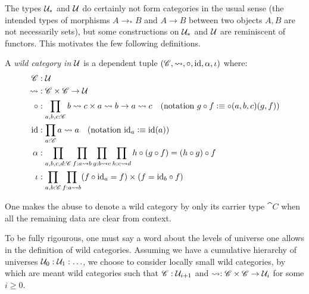 \documentclass[english,a4]{article}
\renewcommand{\ap}[1]{\left[{#1}\right]}
\newcommand{\ptdto}{\to_\ast}%
\newcommand{\UUptd}{\UU_{\ast}}
\begin{document}

\label{sec:wild-functors}
\def\hom(#1,#2){#1 \rightsquigarrow #2}
%
The types $\UUptd$ and $\mathcal{U}$ do certainly not form categories in the usual
sense (the intended types of morphisms $A \ptdto B$ and $A\to B$ between two
objects $A,B$ are not necessarily sets), but some constructions on $\UUptd$ and $\mathcal{U}$ are
reminiscent of functors. This motivates the few following definitions.

\begin{definition}
  A \emph{wild category in} $\mathcal{U}$ is a dependent tuple $(\cat C, \hom( , ), \circ, \id, \alpha,
  \iota)$ where:
  \begin{align*}
    \cat C&: \UU \\
    \hom( , )&: \cat C \times \cat C \to \UU \\
    \circ&: \prod_{a,b,c:\cat C} \hom(b,c) \times \hom(a,b) \to \hom(a,c) 
    \quad (\text{notation}\ g\circ f \defequi \circ(a,b,c)(g,f)) \\
    \id&: \prod_{a:\cat C} \hom(a,a) \quad (\text{notation}\ \id_a \defequi \id(a)) \\
    \alpha&: \prod_{a,b,c,d:\cat C} \prod_{f:\hom(a,b)} \prod_{g:\hom(b,c)} \prod_{h:\hom(c,d)}
    h\circ (g \circ f) = (h \circ g) \circ f \\
    \iota&: \prod_{a,b:\cat C} \prod_{f:\hom(a,b)} (f\circ \id_a = f) \times (f = \id_b \circ f)
  \end{align*}
  \label{defn:wild-cat}
\end{definition}
One makes the abuse to denote a wild category by only its carrier type $\cat C$ when
all the remaining data are clear from context.

\begin{remark}
  To be fully rigourous, one must say a word about the levels of universe one
  allows in the definition of wild categories. Assuming we have a cumulative
  hierarchy of universes $\mathcal{U}_0 : \mathcal{U}_1 : \ldots$, we choose to consider
  locally small wild categories, by which are meant wild categories such that
  $\mathscr{C}:\mathcal{U}_{i+1}$ and $\hom(,): \cat C \times \cat C \to \UU_i$ for some
  $i\geq 0$.
  \label{rem:universes-locally-small-cats}
\end{remark}
\end{document}
